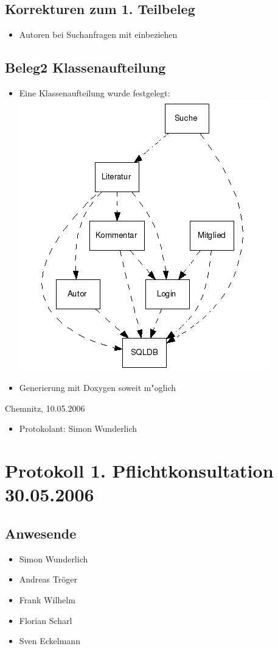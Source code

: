 			\subsection{Korrekturen zum 1. Teilbeleg}
			\begin{itemize}
				\item Autoren bei Suchanfragen mit einbeziehen
			\end{itemize}
			\subsection{Beleg2 Klassenaufteilung}
			\begin{itemize}
					\item Eine Klassenaufteilung wurde festgelegt:
					\\\includegraphics[scale=0.8]{../protokoll/2006_05_10.png}
					\item Generierung mit Doxygen soweit m"oglich
			\end{itemize}
			Chemnitz, 10.05.2006
			\begin{itemize}
				\item Protokolant: Simon Wunderlich
			\end{itemize}
\newpage
		\section{Protokoll 1. Pflichtkonsultation 30.05.2006}
		\subsection{Anwesende}
		\begin{itemize}
			\item Simon Wunderlich
			\item Andreas Tröger
			\item Frank Wilhelm
			\item Florian Scharl
			\item Sven Eckelmann
		\end{itemize}
